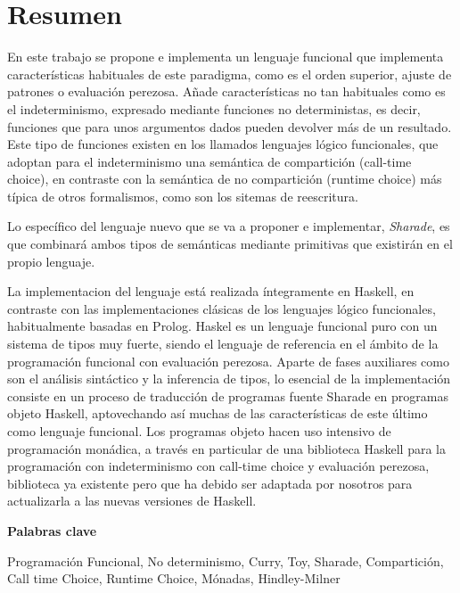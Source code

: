 \documentclass[class=article, crop=false]{standalone}
\begin{document}
\section{Resumen}

En este trabajo se propone e implementa un lenguaje funcional que implementa características
habituales de este paradigma, como es el orden superior, ajuste de patrones o evaluación
perezosa. Añade características no tan habituales como es el indeterminismo, expresado
mediante funciones no deterministas, es decir, funciones que para unos argumentos dados
pueden devolver más de un resultado. Este tipo de funciones existen en los llamados lenguajes
lógico funcionales, que adoptan para el indeterminismo una semántica de compartición
(call-time choice), en contraste con la semántica de no compartición (runtime choice) más
típica de otros formalismos, como son los sitemas de reescritura.

Lo específico del lenguaje nuevo que se va a proponer e implementar, \textit{Sharade}, es que
combinará ambos tipos de semánticas mediante primitivas que existirán en el propio lenguaje.

La implementacion del lenguaje está realizada íntegramente en Haskell, en contraste con las
implementaciones clásicas de los lenguajes lógico funcionales, habitualmente basadas en
Prolog. Haskel es un lenguaje funcional puro con un sistema de tipos muy fuerte, siendo el
lenguaje de referencia en el ámbito de la programación funcional con evaluación perezosa.
Aparte de fases auxiliares como son el análisis sintáctico y la inferencia de tipos, lo
esencial de la implementación consiste en un proceso de traducción de programas fuente
Sharade en programas objeto Haskell, aptovechando así muchas de las características de este
último como lenguaje funcional. Los programas objeto hacen uso intensivo de programación
monádica, a través en particular de una biblioteca Haskell para la programación con
indeterminismo con call-time choice y evaluación perezosa, biblioteca ya existente pero que
ha debido ser adaptada por nosotros para actualizarla a las nuevas versiones de Haskell.

\vspace{0.5cm}
\textbf{Palabras clave}

Programación Funcional, No determinismo, Curry, Toy, Sharade, Compartición, Call time Choice,
Runtime Choice, Mónadas, Hindley-Milner
\end{document}
